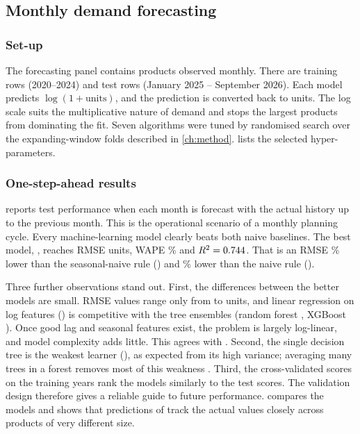 \subsection{Monthly demand forecasting}
\subsubsection{Set-up}
The forecasting panel contains \PanelSeries products observed monthly. There are \PanelTrain training rows
(2020--2024) and \PanelTest test rows (January 2025 -- September 2026). Each model predicts
$\log(1+\text{units})$, and the prediction is converted back to units. The log scale suits the multiplicative
nature of demand and stops the largest products from dominating the fit. Seven algorithms were tuned by
randomised search over the expanding-window folds described in \cref{ch:method}. 
lists the selected hyper-parameters.

\subsubsection{One-step-ahead results}
 reports test performance when each month is forecast with the actual history up to the
previous month. This is the operational scenario of a monthly planning cycle. Every machine-learning model
clearly beats both naive baselines. The best model, \BestReg, reaches RMSE \BestRegRMSE units, WAPE
\BestRegWAPE\% and $R^2=0.744$. That is an RMSE \GainVsSNaive\% lower than the seasonal-naive rule
(\SNaiveRMSE) and \GainVsNaive\% lower than the naive rule (\NaiveRMSE).



Three further observations stand out. First, the differences between the better models are small. RMSE values
range only from \BestRegRMSE to \WorstRegRMSE units, and linear regression on log features (\LinRMSE) is
competitive with the tree ensembles (random forest \RFRMSE, XGBoost \XGBRMSE). Once good lag and seasonal
features exist, the problem is largely log-linear, and model complexity adds little. This agrees with
\citet{makridakis2018}. Second, the single decision tree is the weakest learner (\DTRMSE), as expected from its
high variance; averaging many trees in a forest removes most of this weakness \citep{breiman2001}. Third, the
cross-validated scores on the training years rank the models similarly to the test scores. The validation
design therefore gives a reliable guide to future performance.  compares the models and
shows that predictions of \BestReg track the actual values closely across products of very different size.

